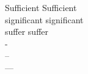 \documentclass[10pt]{article}
\begin{document}
	
	\noindent
	\Huge
	Sufficient \hfil Suf{}f{}icient\\
	significant \hfil signif{}icant\\
	suffer \hfill suf{}fer\\
	-\\
	--\\
	---
	
\end{document}
